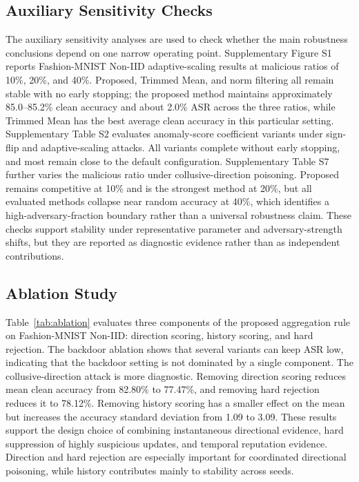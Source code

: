 \documentclass[preprint,12pt]{elsarticle}
\begin{document}
\subsection{Auxiliary Sensitivity Checks}

The auxiliary sensitivity analyses are used to check whether the main robustness conclusions depend on one narrow operating point. Supplementary Figure S1 reports Fashion-MNIST Non-IID adaptive-scaling results at malicious ratios of 10\%, 20\%, and 40\%. Proposed, Trimmed Mean, and norm filtering all remain stable with no early stopping; the proposed method maintains approximately 85.0--85.2\% clean accuracy and about 2.0\% ASR across the three ratios, while Trimmed Mean has the best average clean accuracy in this particular setting. Supplementary Table S2 evaluates anomaly-score coefficient variants under sign-flip and adaptive-scaling attacks. All variants complete without early stopping, and most remain close to the default configuration. Supplementary Table S7 further varies the malicious ratio under collusive-direction poisoning. Proposed remains competitive at 10\% and is the strongest method at 20\%, but all evaluated methods collapse near random accuracy at 40\%, which identifies a high-adversary-fraction boundary rather than a universal robustness claim. These checks support stability under representative parameter and adversary-strength shifts, but they are reported as diagnostic evidence rather than as independent contributions.

\subsection{Ablation Study}

Table~\ref{tab:ablation} evaluates three components of the proposed aggregation rule on Fashion-MNIST Non-IID: direction scoring, history scoring, and hard rejection. The backdoor ablation shows that several variants can keep ASR low, indicating that the backdoor setting is not dominated by a single component. The collusive-direction attack is more diagnostic. Removing direction scoring reduces mean clean accuracy from 82.80\% to 77.47\%, and removing hard rejection reduces it to 78.12\%. Removing history scoring has a smaller effect on the mean but increases the accuracy standard deviation from 1.09 to 3.09. These results support the design choice of combining instantaneous directional evidence, hard suppression of highly suspicious updates, and temporal reputation evidence. Direction and hard rejection are especially important for coordinated directional poisoning, while history contributes mainly to stability across seeds.
\end{document}
